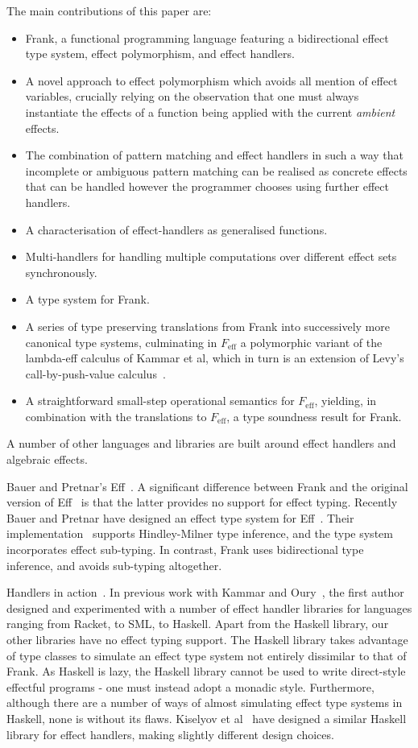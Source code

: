 \documentclass[preprint]{sigplanconf}
\newcommand{\feff}{$F_\textrm{eff}$\xspace}
\begin{document}
The main contributions of this paper are:
\begin{itemize}
\item Frank, a functional programming language featuring a
  bidirectional effect type system, effect polymorphism, and effect
  handlers.
\item A novel approach to effect polymorphism which avoids all mention
  of effect variables, crucially relying on the observation that one
  must always instantiate the effects of a function being applied with
  the current \emph{ambient} effects.
\item The combination of pattern matching and effect handlers in such
  a way that incomplete or ambiguous pattern matching can be realised
  as concrete effects that can be handled however the programmer
  chooses using further effect handlers.
\item A characterisation of effect-handlers as generalised functions.
\item Multi-handlers for handling multiple computations over different
  effect sets synchronously.
\item A type system for Frank.
\item A series of type preserving translations from Frank into
  successively more canonical type systems, culminating in \feff a
  polymorphic variant of the lambda-eff calculus of Kammar et al,
  which in turn is an extension of Levy's call-by-push-value
  calculus~\cite{Levy2004}.
\item A straightforward small-step operational semantics for \feff,
  yielding, in combination with the translations to \feff, a type
  soundness result for Frank.
\end{itemize}

A number of other languages and libraries are built around effect
handlers and algebraic effects.

Bauer and Pretnar's Eff~\cite{BauerP12}. A significant difference
between Frank and the original version of Eff~\cite{BauerP12} is that
the latter provides no support for effect typing. Recently Bauer and
Pretnar have designed an effect type system for
Eff~\cite{BauerP13}. Their implementation~\cite{Pretnar13} supports
Hindley-Milner type inference, and the type system incorporates effect
sub-typing. In contrast, Frank uses bidirectional type inference, and
avoids sub-typing altogether.

Handlers in action~\cite{KammarLO13}. In previous work with Kammar and
Oury~\cite{KammarLO13}, the first author designed and experimented
with a number of effect handler libraries for languages ranging from
Racket, to SML, to Haskell. Apart from the Haskell library, our other
libraries have no effect typing support. The Haskell library takes
advantage of type classes to simulate an effect type system not
entirely dissimilar to that of Frank. As Haskell is lazy, the Haskell
library cannot be used to write direct-style effectful programs - one
must instead adopt a monadic style. Furthermore, although there are a
number of ways of almost simulating effect type systems in Haskell,
none is without its flaws. Kiselyov et al~\cite{KiselyovSS13} have
designed a similar Haskell library for effect handlers, making
slightly different design choices.
\end{document}
